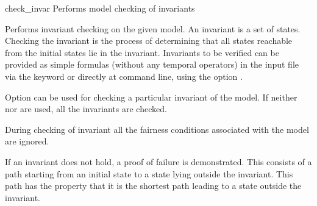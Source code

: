 \begin{nusmvCommand} {check\_invar} {Performs model checking of invariants}
 
 
Performs invariant checking on the given model. An invariant is a set
of states. Checking the invariant is the process of determining that
all states reachable from the initial states lie in the invariant.
Invariants to be verified can be provided as simple formulas (without
any temporal operators) in the input file via the 
keyword or directly at command line, using the option .
   
Option  can be used for checking a particular invariant
of the model. If neither  nor  are used,
all the invariants are checked.
  
During checking of invariant all the fairness conditions associated
with the model are ignored.
  
If an invariant does not hold, a proof of failure is demonstrated.
This consists of a path starting from an initial state to a state
lying outside the invariant. This path has the property that it is the
shortest path leading to a state outside the invariant.

\begin{cmdOpt}

 
            

\end{cmdOpt}

\end{nusmvCommand}
